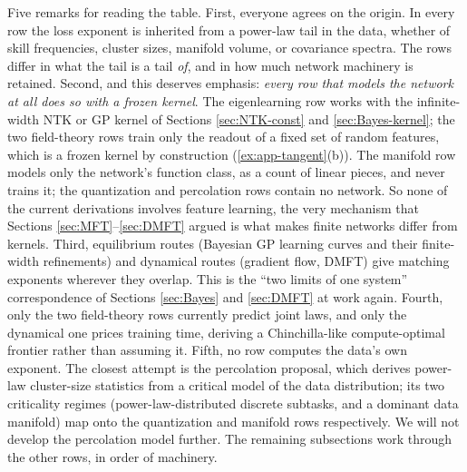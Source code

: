 \documentclass[11pt]{article}
\begin{document}
Five remarks for reading the table. First, everyone agrees on the origin. In every row the loss exponent is inherited from a power-law tail in the data, whether of skill frequencies, cluster sizes, manifold volume, or covariance spectra. The rows differ in what the tail is a tail \emph{of}, and in how much network machinery is retained. Second, and this deserves emphasis: \emph{every row that models the network at all does so with a frozen kernel}. The eigenlearning row works with the infinite-width NTK or GP kernel of Sections \ref{sec:NTK-const} and \ref{sec:Bayes-kernel}; the two field-theory rows train only the readout of a fixed set of random features, which is a frozen kernel by construction (\cref{ex:app-tangent}(b)). The manifold row models only the network's function class, as a count of linear pieces, and never trains it; the quantization and percolation rows contain no network. So none of the current derivations involves feature learning, the very mechanism that Sections \ref{sec:MFT}--\ref{sec:DMFT} argued is what makes finite networks differ from kernels. Third, equilibrium routes (Bayesian GP learning curves and their finite-width refinements) and dynamical routes (gradient flow, DMFT) give matching exponents wherever they overlap. This is the ``two limits of one system'' correspondence of Sections \ref{sec:Bayes} and \ref{sec:DMFT} at work again. Fourth, only the two field-theory rows currently predict joint laws, and only the dynamical one prices training time, deriving a Chinchilla-like compute-optimal frontier rather than assuming it. Fifth, no row computes the data's own exponent. The closest attempt is the percolation proposal, which derives power-law cluster-size statistics from a critical model of the data distribution; its two criticality regimes (power-law-distributed discrete subtasks, and a dominant data manifold) map onto the quantization and manifold rows respectively. We will not develop the percolation model further. The remaining subsections work through the other rows, in order of machinery.
\end{document}
